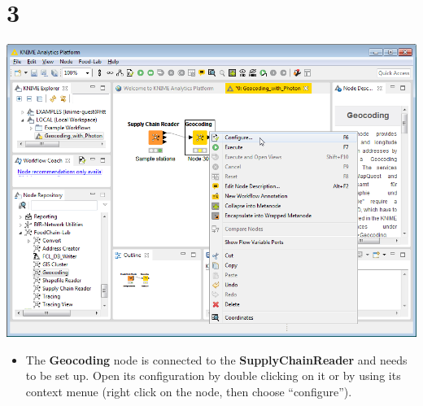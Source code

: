 \documentclass[10pt]{beamer}
\begin{document}
\section{3}
\begin{frame}
	\begin{center}
  		\includegraphics[height=0.6\textheight]{3.png}
	\end{center}
	\begin{itemize}
    \item The \textbf{Geocoding} node is connected to the \textbf{SupplyChainReader} and needs to be set up. Open its configuration by double clicking on it or by using its context menue (right click on the node, then choose ``configure'').
	\end{itemize}
\end{frame}
\end{document}

